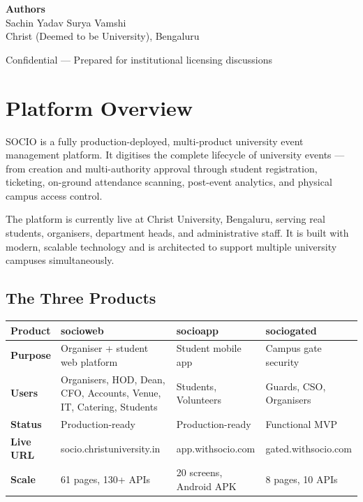 \documentclass[12pt,a4paper]{article}
\begin{document}
\begin{titlepage}
    \vfill

    {\normalsize
        \textbf{Authors}\\[0.3cm]
        Sachin Yadav \quad\textbullet\quad Surya Vamshi\\[0.2cm]
        {\color{darkgray} Christ (Deemed to be University), Bengaluru}
    }

    \vspace{1cm}
    {\small\color{darkgray} Confidential — Prepared for institutional licensing discussions \textbullet\ \the\year}
\end{titlepage}

\newpage
\tableofcontents
\newpage

\section{Platform Overview}

SOCIO is a fully production-deployed, multi-product university event management platform. It digitises the complete lifecycle of university events — from creation and multi-authority approval through student registration, ticketing, on-ground attendance scanning, post-event analytics, and physical campus access control.

The platform is currently live at Christ University, Bengaluru, serving real students, organisers, department heads, and administrative staff. It is built with modern, scalable technology and is architected to support multiple university campuses simultaneously.

\subsection{The Three Products}

\begin{tabularx}{\textwidth}{L{2.8cm} L{3.5cm} L{3.5cm} L{3.5cm}}
\toprule
{}
\textbf{Product} & \textbf{socioweb} & \textbf{socioapp} & \textbf{sociogated} \\
\midrule
\textbf{Purpose} & Organiser + student web platform & Student mobile app & Campus gate security \\
\addlinespace
\textbf{Users} & Organisers, HOD, Dean, CFO, Accounts, Venue, IT, Catering, Students & Students, Volunteers & Guards, CSO, Organisers \\
\addlinespace
\textbf{Status} & Production-ready & Production-ready & Functional MVP \\
\addlinespace
\textbf{Live URL} & socio.christuniversity.in & app.withsocio.com & gated.withsocio.com \\
\addlinespace
\textbf{Scale} & 61 pages, 130+ APIs & 20 screens, Android APK & 8 pages, 10 APIs \\
\bottomrule
\end{tabularx}
\end{document}
